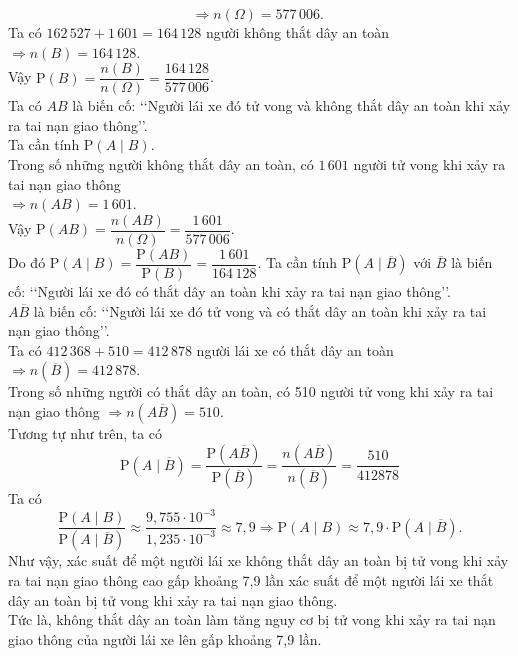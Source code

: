 \begin{ex}
{\begin{itemchoice}
			$$\Rightarrow n(\Omega)=577\,006 \text{. }$$
			Ta có $162\,527+1\,601=164\,128$ người không thắt dây an toàn $\Rightarrow n(B)=164\,128$.\\
			Vậy $\mathrm{P}(B)=\dfrac{n(B)}{n(\Omega)}=\dfrac{164\,128}{577\,006}$.\\
			\itemch Ta có $AB$ là biến cố: \lq\lq Người lái xe đó tử vong và không thắt dây an toàn khi xảy ra tai nạn giao thông\rq\rq.\\
			Ta cần tính $\mathrm{P}(A\mid B)$.\\
			Trong số những người không thắt dây an toàn, có $1\,601$ người tử vong khi xảy ra tai nạn giao thông\\ 
			$\Rightarrow n(AB)=1\,601$. \\
			Vậy $\mathrm{P}(AB)=\dfrac{n(AB)}{n(\Omega)}=\dfrac{1\,601}{577\,006}$.\\
			Do đó $\mathrm{P}(A\mid B)=\dfrac{\mathrm{P}(AB)}{\mathrm{P}(B)}=\dfrac{1\,601}{164\,128}$.
			\itemch Ta cần tính $\mathrm{P}\left(A\mid\overline{B}\right)$ với 
			$\overline{B}$ là biến cố: \lq\lq Người lái xe đó có thắt dây an toàn khi xảy ra tai nạn giao thông\rq\rq.\\
			$A\overline{B}$ là biến cố: \lq\lq Người lái xe đó tử vong và có thắt dây an toàn khi xảy ra tai nạn giao thông\rq\rq.\\
			Ta có $412\,368+510=412\,878$ người lái xe có thắt dây an toàn $\Rightarrow n(\overline{B})=412\,878$.\\
			Trong số những người có thắt dây an toàn, có 510 người tử vong khi xảy ra tai nạn giao thông $\Rightarrow n(A\overline{B})=510$.\\
			Tương tự như trên, ta có
			$$\mathrm{P}\left(A \mid\overline{B}\right)=\dfrac{\mathrm{P}\left(A \overline{B}\right)}{\mathrm{P}\left(\overline{B}\right)}=\dfrac{n\left(A \overline{B}\right)}{n\left(\overline{B}\right)}=\dfrac{510}{412878}$$
			\itemch Ta có
			$$\dfrac{\mathrm{P}(A \mid B)}{\mathrm{P}\left(A \mid\overline{B}\right)} \approx\dfrac{9{,}755 \cdot 10^{-3}}{1{,}235 \cdot 10^{-3}} \approx 7{,}9 \Rightarrow \mathrm{P}(A \mid B) \approx 7{,}9 \cdot \mathrm{P}\left(A \mid\overline{B}\right).$$
			Như vậy, xác suất để một người lái xe không thắt dây an toàn bị tử vong khi xảy ra tai nạn giao thông cao gấp khoảng 7{,}9 lần xác suất để một người lái xe thắt dây an toàn bị tử vong khi xảy ra tai nạn giao thông. \\
			Tức là, không thắt dây an toàn làm tăng nguy cơ bị tử vong khi xảy ra tai nạn giao thông của người lái xe lên gấp khoảng 7{,}9 lần.
		\end{itemchoice}
	}
\end{ex}

